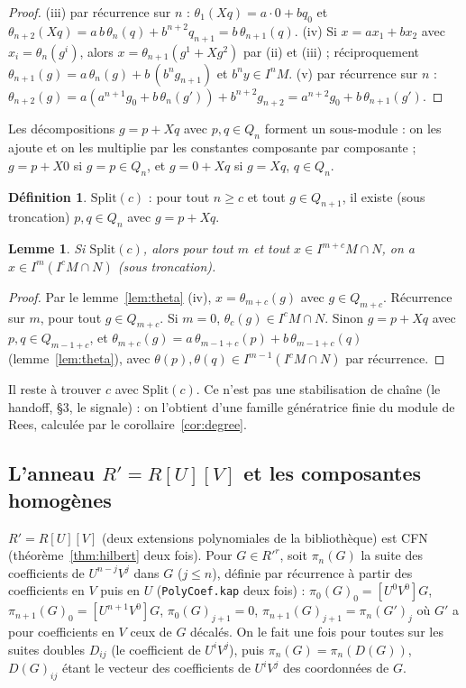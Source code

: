 \documentclass[11pt]{amsart}
\newtheorem{lemma}[theorem]{Lemme}
\theoremstyle{definition}
\newtheorem{definition}[theorem]{Définition}
\theoremstyle{remark}
\begin{document}
\begin{proof}
(iii) par récurrence sur $n$ :
$\theta_1(Xq)=a\cdot0+bq_0$ et
$\theta_{n+2}(Xq)=a\,b\,\theta_n(q)+b^{n+2}q_{n+1}=b\,\theta_{n+1}(q)$.
(iv) Si $x=ax_1+bx_2$ avec $x_i=\theta_n(g^i)$, alors
$x=\theta_{n+1}(g^1+Xg^2)$ par (ii) et (iii) ; réciproquement
$\theta_{n+1}(g)=a\,\theta_n(g)+b\,(b^ng_{n+1})$ et $b^ny\in I^nM$.
(v) par récurrence sur $n$ :
$\theta_{n+2}(g)=a(a^{n+1}g_0+b\,\theta_n(g'))+b^{n+2}g_{n+2}
=a^{n+2}g_0+b\,\theta_{n+1}(g')$.
\end{proof}

Les décompositions $g=p+Xq$ avec $p,q\in Q_n$ forment un sous-module :
on les ajoute et on les multiplie par les constantes composante par
composante ; $g=p+X0$ si $g=p\in Q_n$, et $g=0+Xq$ si $g=Xq$, $q\in Q_n$.

\begin{definition}
$\mathrm{Split}(c)$ : pour tout $n\ge c$ et tout $g\in Q_{n+1}$, il existe
(sous troncation) $p,q\in Q_n$ avec $g=p+Xq$.
\end{definition}

\begin{lemma}\label{lem:split-ar}
Si $\mathrm{Split}(c)$, alors pour tout $m$ et tout
$x\in I^{m+c}M\cap N$, on a $x\in I^m(I^cM\cap N)$ (sous troncation).
\end{lemma}

\begin{proof}
Par le lemme~\ref{lem:theta} (iv), $x=\theta_{m+c}(g)$ avec
$g\in Q_{m+c}$. Récurrence sur $m$, pour tout $g\in Q_{m+c}$. Si $m=0$,
$\theta_c(g)\in I^cM\cap N$. Sinon $g=p+Xq$ avec
$p,q\in Q_{m-1+c}$, et
$\theta_{m+c}(g)=a\,\theta_{m-1+c}(p)+b\,\theta_{m-1+c}(q)$ (lemme~\ref{lem:theta}),
avec $\theta(p),\theta(q)\in I^{m-1}(I^cM\cap N)$ par récurrence.
\end{proof}

Il reste à trouver $c$ avec $\mathrm{Split}(c)$. Ce n'est pas une
stabilisation de chaîne (le handoff, \S3, le signale) : on l'obtient
d'une famille génératrice finie du module de Rees, calculée par le
corollaire~\ref{cor:degree}.

\subsection{L'anneau $R'=R[U][V]$ et les composantes homogènes}
$R'=R[U][V]$ (deux extensions polynomiales de la bibliothèque) est CFN
(théorème~\ref{thm:hilbert} deux fois). Pour $G\in R'^r$, soit
$\pi_n(G)$ la suite des coefficients de $U^{n-j}V^j$ dans $G$ ($j\le n$),
définie par récurrence à partir des coefficients en $V$ puis en $U$
(\texttt{PolyCoef.kap} deux fois) :
$\pi_0(G)_0=[U^0V^0]G$, $\pi_{n+1}(G)_0=[U^{n+1}V^0]G$,
$\pi_0(G)_{j+1}=0$, $\pi_{n+1}(G)_{j+1}=\pi_n(G')_j$ où $G'$ a pour
coefficients en $V$ ceux de $G$ décalés. On le fait une fois pour toutes
sur les suites doubles $D_{ij}$ (le coefficient de $U^iV^j$), puis
$\pi_n(G)=\pi_n(D(G))$, $D(G)_{ij}$ étant le vecteur des coefficients de
$U^iV^j$ des coordonnées de $G$.
\end{document}
